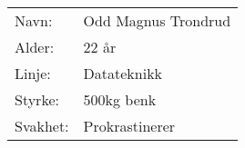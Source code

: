 \begin{table}[H]
\begin{tabular}{l l}
        Navn: & Odd Magnus Trondrud \\
        Alder: & 22 år \\ 
        Linje: & Datateknikk \\
        Styrke: & 500kg benk \\
        Svakhet: & Prokrastinerer
    \end{tabular}
\end{table}
